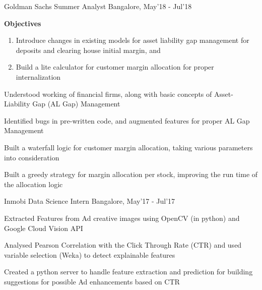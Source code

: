 
\begin{cventries}

	\cventry
	{Goldman Sachs}
	{Summer Analyst}
	{Bangalore, May'18 - Jul'18}
	{}
	{}
	{
		\vspace{-4mm}
		\begin{addmargin}{1em}
			\textbf{Objectives}
			\begin{enumerate}[label=(\roman*)]
				\item Introduce changes in existing models for asset liability gap management for deposits and clearing house initial margin, and
				\item Build a lite calculator for customer margin allocation for proper internalization 
			\end{enumerate}
		\end{addmargin}
		\vspace{4.5mm}
		\begin{cvitems}
		\item Understood working of financial firms, along with basic concepts of Asset-Liability Gap (AL Gap) Management 
		\item Identified bugs in pre-written code, and augmented features for proper AL Gap Management 
		\item Built a waterfall logic for customer margin allocation, taking various parameters into consideration 
		\item Built a greedy strategy for margin allocation per stock, improving the run time of the allocation logic
		\end{cvitems}
	}

	\cventry
	{Inmobi}
	{Data Science Intern}
	{Bangalore, May'17 - Jul'17}
	{}
	{}
	{
		\begin{cvitems}
		\item Extracted Features from Ad creative images using OpenCV (in python) and Google Cloud Vision API
		\item Analysed Pearson Correlation with the Click Through Rate (CTR) and used variable selection (Weka) to detect explainable features 
		\item Created a python server to handle feature extraction and prediction for building suggestions for possible Ad enhancements based on CTR
		\end{cvitems}
	}


\end{cventries}
